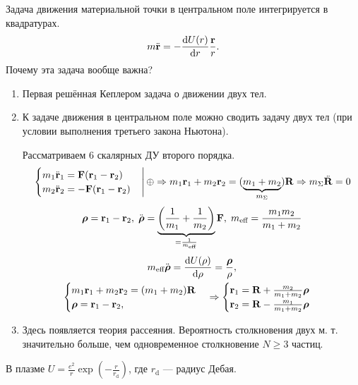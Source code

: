 \documentclass[12pt, a4paper]{article}
\begin{document}
Задача движения материальной точки в центральном поле интегрируется в квадратурах.
\begin{equation}
m \ddot{\vb{r}} = - \dv{U(r)}{r} \frac{\vb{r}}{r}.
\end{equation}
Почему эта задача вообще важна?
\begin{enumerate}
\item Первая решённая Кеплером задача о движении двух тел.
\begin{figure}[h]
\def\svgwidth{9cm}

\end{figure}
\item К задаче движения в центральном поле можно сводить задачу двух тел (при условии выполнения третьего закона Ньютона).\\
\begin{figure}[h]
\def\svgwidth{4cm}

\end{figure}
Рассматриваем 6 скалярных ДУ второго порядка.
\begin{equation}
\left. \begin{cases}
m_1 \ddot{\vb{r}}_1 = \vb{F} (\vb{r}_1 - \vb{r}_2)\\
m_2 \ddot{\vb{r}}_2 = -\vb{F} (\vb{r}_1 - \vb{r}_2)
\end{cases} \right|
\oplus \Rightarrow 
m_1 \vb{r}_1 + m_2 \vb{r}_2 = (\underbrace{m_1 + m_2}_{m_\Sigma}) \vb{R} \Rightarrow m_\Sigma \ddot{\vb{R}} = 0
\end{equation}
\begin{equation}
\vb*{\rho} = \vb{r}_1 - \vb{r}_2, \; \ddot{\vb*{\rho}} = \underbrace{\left(\frac{1}{m_1} + \frac{1}{m_2}\right)}_{=\frac{1}{m_\text{eff}}} \vb{F}, \; m_\text{eff} = \frac{m_1 m_2}{m_1 + m_2}
\end{equation}
\begin{gather}
m_\text{eff}  \ddot{\vb*{\rho}} = \dv{U(\rho)}{\rho} = \frac{\vb*{\rho}}{\rho},\\
\begin{cases}
m_1 \vb{r}_1 + m_2 \vb{r}_2 = (m_1 + m_2) \vb{R}\\
\vb*{\rho} = \vb{r}_1 - \vb{r}_2,
\end{cases} \Rightarrow
\begin{cases}
\vb{r}_1 = \vb{R} + \frac{m_2}{m_1 + m_2} \vb*{\rho}\\
\vb{r}_2 = \vb{R} - \frac{m_1}{m_1 + m_2} \vb*{\rho}
\end{cases}
\end{gather}
\item Здесь появляется теория рассеяния. Вероятность столкновения двух м. т. значительно больше, чем одновременное столкновение $N \geqslant 3$ частиц.
\end{enumerate}
В плазме $U = \frac{e^2}{r} \exp \left(- \frac{r}{r_\text{d}}\right)$, где $r_\text{d}$ --- радиус Дебая. 
\end{document}
